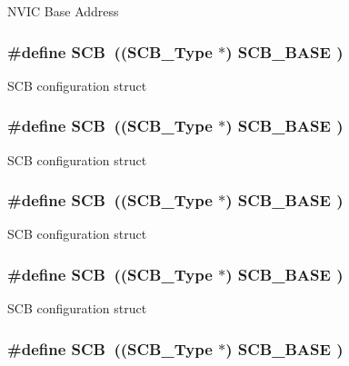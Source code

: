 N\-V\-I\-C Base Address \hypertarget{group___c_m_s_i_s__core__base_gaaaf6477c2bde2f00f99e3c2fd1060b01}{
\subsubsection[{S\-C\-B}]{\setlength{\rightskip}{0pt plus 5cm}\#define S\-C\-B~(({\bf S\-C\-B\-\_\-\-Type}       $\ast$)     {\bf S\-C\-B\-\_\-\-B\-A\-S\-E}      )}}\label{group___c_m_s_i_s__core__base_gaaaf6477c2bde2f00f99e3c2fd1060b01}
S\-C\-B configuration struct \hypertarget{group___c_m_s_i_s__core__base_gaaaf6477c2bde2f00f99e3c2fd1060b01}{
\subsubsection[{S\-C\-B}]{\setlength{\rightskip}{0pt plus 5cm}\#define S\-C\-B~(({\bf S\-C\-B\-\_\-\-Type}       $\ast$)     {\bf S\-C\-B\-\_\-\-B\-A\-S\-E}      )}}\label{group___c_m_s_i_s__core__base_gaaaf6477c2bde2f00f99e3c2fd1060b01}
S\-C\-B configuration struct \hypertarget{group___c_m_s_i_s__core__base_gaaaf6477c2bde2f00f99e3c2fd1060b01}{
\subsubsection[{S\-C\-B}]{\setlength{\rightskip}{0pt plus 5cm}\#define S\-C\-B~(({\bf S\-C\-B\-\_\-\-Type}       $\ast$)     {\bf S\-C\-B\-\_\-\-B\-A\-S\-E}      )}}\label{group___c_m_s_i_s__core__base_gaaaf6477c2bde2f00f99e3c2fd1060b01}
S\-C\-B configuration struct \hypertarget{group___c_m_s_i_s__core__base_gaaaf6477c2bde2f00f99e3c2fd1060b01}{
\subsubsection[{S\-C\-B}]{\setlength{\rightskip}{0pt plus 5cm}\#define S\-C\-B~(({\bf S\-C\-B\-\_\-\-Type}       $\ast$)     {\bf S\-C\-B\-\_\-\-B\-A\-S\-E}      )}}\label{group___c_m_s_i_s__core__base_gaaaf6477c2bde2f00f99e3c2fd1060b01}
S\-C\-B configuration struct \hypertarget{group___c_m_s_i_s__core__base_gaaaf6477c2bde2f00f99e3c2fd1060b01}{
\subsubsection[{S\-C\-B}]{\setlength{\rightskip}{0pt plus 5cm}\#define S\-C\-B~(({\bf S\-C\-B\-\_\-\-Type}       $\ast$)     {\bf S\-C\-B\-\_\-\-B\-A\-S\-E}      )}}\label{group___c_m_s_i_s__core__base_gaaaf6477c2bde2f00f99e3c2fd1060b01}
